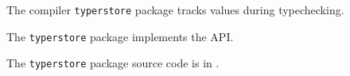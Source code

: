 
The compiler {\tt typerstore} package tracks values during typechecking.

The {\tt typerstore} package implements the  API.

The {\tt typerstore} package source code is in .

